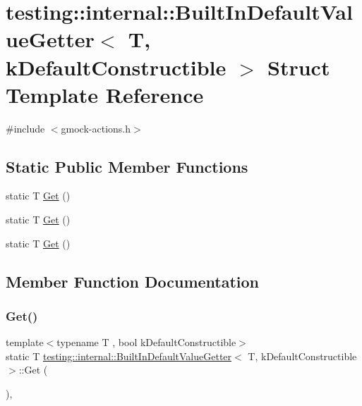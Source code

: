 \hypertarget{structtesting_1_1internal_1_1_built_in_default_value_getter}{}\section{testing\+::internal\+::Built\+In\+Default\+Value\+Getter$<$ T, k\+Default\+Constructible $>$ Struct Template Reference}
\label{structtesting_1_1internal_1_1_built_in_default_value_getter}


{\ttfamily \#include $<$gmock-\/actions.\+h$>$}

\subsection*{Static Public Member Functions}
\begin{DoxyCompactItemize}
\item 
static T \mbox{\hyperlink{structtesting_1_1internal_1_1_built_in_default_value_getter_a61c47c50cdb6ab488dabe2cec3b97fc8}{Get}} ()
\item 
static T \mbox{\hyperlink{structtesting_1_1internal_1_1_built_in_default_value_getter_a61c47c50cdb6ab488dabe2cec3b97fc8}{Get}} ()
\item 
static T \mbox{\hyperlink{structtesting_1_1internal_1_1_built_in_default_value_getter_a61c47c50cdb6ab488dabe2cec3b97fc8}{Get}} ()
\end{DoxyCompactItemize}


\subsection{Member Function Documentation}
\mbox{\label{structtesting_1_1internal_1_1_built_in_default_value_getter_a61c47c50cdb6ab488dabe2cec3b97fc8}} 
\subsubsection{\texorpdfstring{Get()}{Get()}\hspace{0.1cm}{\footnotesize\ttfamily [1/3]}}
{\footnotesize\ttfamily template$<$typename T , bool k\+Default\+Constructible$>$ \\
static T \mbox{\hyperlink{structtesting_1_1internal_1_1_built_in_default_value_getter}{testing\+::internal\+::\+Built\+In\+Default\+Value\+Getter}}$<$ T, k\+Default\+Constructible $>$\+::Get (\begin{DoxyParamCaption}{ }\end{DoxyParamCaption})\hspace{0.3cm}{\ttfamily [inline]}, {\ttfamily [static]}}

